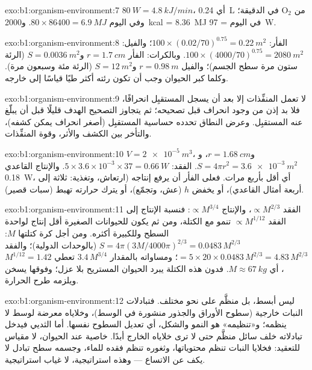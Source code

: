 \begin{solution}{exo:b1:organism-environment:7}
$\qty{80}{W} = \qty{4.8}{kJ/min}$، أي \qty{0.24}{L} من
$\mathrm{O_2}$ في الدقيقة؛ وفي اليوم
$80\times 86400 = \qty{6.9}{MJ}$. و\qty{2000}{kcal}
= \qty{8.36}{MJ} في اليوم = \qty{97}{W}.
\end{solution}

\begin{solution}{exo:b1:organism-environment:8}
الفأر: $100\times(0.02/70)^{0.75} = \qty{0.22}{m^2}$؛ والفيل:
$100\times(4000/70)^{0.75} = \qty{2080}{m^2}$. وبالكرات: الفأر
$r = \qty{1.7}{cm}$ و$S = \qty{0.0036}{m^2}$ (الرئة ستون مرة سطح
الجسم)؛ والفيل $r = \qty{0.98}{m}$ و$S = \qty{12}{m^2}$ (الرئة مئة
وسبعون مرة). وكلما كبر الحيوان وجب أن تكون رئته أكثر طيًا قياسًا
إلى خارجه.
\end{solution}

\begin{solution}{exo:b1:organism-environment:9}
لا تعمل المنفِّذات إلا بعد أن يسجل المستقبِل انحرافًا، فلا بد إذن
من وجود انحراف قبل تصحيحه؛ ثم يتجاوز التصحيح الهدف قليلًا قبل أن
يبلّغ عنه المستقبِل. وعرض النطاق تحدده حساسية المستقبِل (أصغر
انحراف يمكن كشفه)، والتأخر بين الكشف والأثر، وقوة المنفِّذات.
\end{solution}

\begin{solution}{exo:b1:organism-environment:10}
$V = \qty{2e-5}{m^3}$، و$r = \qty{1.68}{cm}$، و$S = 4\pi r^2 =
\qty{3.6e-3}{m^2}$. الفقد:
$5\times 3.6\times 10^{-3}\times 37 =
\qty{0.66}{W}$. والإنتاج
القاعدي \qty{0.18}{W}، أي أقل بأربع مرات. فعلى الفأر أن يرفع إنتاجه
(ارتعاش، وتغذية: ثلاثة إلى أربعة أمثال القاعدي)، أو يخفض $h$ (عش،
وتجمّع)، أو يترك حرارته تهبط (سبات قصير).
\end{solution}

\begin{solution}{exo:b1:organism-environment:11}
الفقد $\propto M^{2/3}$، والإنتاج $\propto M^{3/4}$: فنسبة
الإنتاج إلى الفقد $\propto M^{1/12}$ تنمو مع الكتلة، ومن ثم يكون
للحيوانات الصغيرة أقل إنتاج لواحدة السطح وللكبيرة أكثره. ومن أجل
كرة كتلتها $M$: $S = 4\pi(3M/4000\pi)^{2/3} = \num{0.0483}\,M^{2/3}$
(بالوحدات الدولية)؛ والفقد
$= 5\times 20\times 0.0483\,M^{2/3} = 4.83\,M^{2/3}$؛ ومساواته
بالمقدار $3.4\,M^{3/4}$ تعطي $M^{1/12} = 1.42$، أي
$M \approx \qty{67}{kg}$. فدون هذه الكتلة يبرد الحيوان المستريح بلا
عزل؛ وفوقها يسخن ويلزمه طرح الحرارة.
\end{solution}

\begin{solution}{exo:b1:organism-environment:12}
ليس أبسط، بل منظَّم على نحو مختلف. فتبادلات النبات خارجية (سطوح
الأوراق والجذور منشورة في الوسط)، وخلاياه معرضة لوسط لا ينظمه؛
و«تنظيمه» هو النمو والشكل، أي تعديل السطوح نفسها. أما الثديي فيدخل
تبادلاته خلف سائل منظَّم حتى لا ترى خلاياه الخارج أبدًا. 
خاصية  عند الحيوان، لا مقياس للتعقيد: فخلايا النبات
تنظم محتوياتها، وثغوره تنظم فقده للماء، وجسمه سطح تبادل لا يكف عن
الاتساع --- وهذه استراتيجية، لا غياب استراتيجية.
\end{solution}

